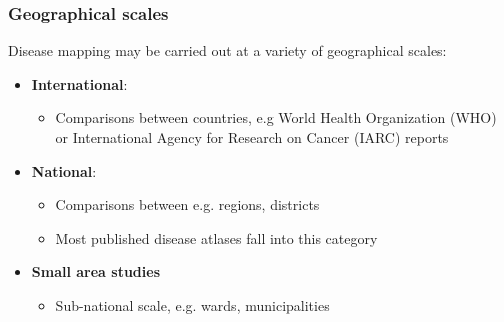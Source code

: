 \documentclass[12pt]{beamer}
\begin{document}
\begin{frame}
    \frametitle{Geographical scales}
Disease mapping may be carried out at a variety of geographical scales:
\begin{itemize}
\item \vfill \textbf{International}:
    \begin{itemize}
    \item Comparisons between countries, e.g World Health Organization (WHO) or International Agency for Research on Cancer (IARC) reports
    \end{itemize}
\item \vfill \textbf{National}:
    \begin{itemize}
    \item Comparisons between e.g. regions, districts
    \item  \vfill Most published disease atlases fall into this category
    \end{itemize}
\item \vfill \textbf{Small area studies}
    \begin{itemize}
    \item \vfill Sub-national scale, e.g. wards, municipalities
    \end{itemize}
\end{itemize}
\end{frame}


\end{document}
